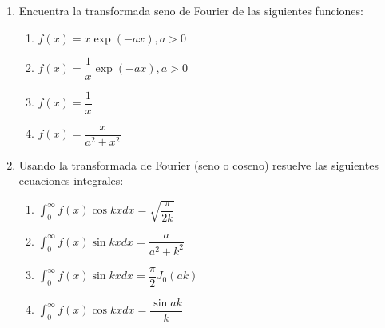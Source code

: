 \begin{enumerate}
\item Encuentra la transformada seno de Fourier de las siguientes funciones:
\begin{enumerate}[label=\roman*)]
\item $f(x) = x \exp(-a x), a>0$
\item $f(x) = \dfrac{1}{x} \exp(-a x), a>0$
\item $f(x) = \dfrac{1}{x}$
\item $f(x) = \dfrac{x}{a^{2} + x^{2}}$
\end{enumerate}
\item Usando la transformada de Fourier (seno o coseno) resuelve las siguientes ecuaciones integrales:
\begin{enumerate}[label=\roman*)]
\item $\displaystyle \int_{0}^{\infty} f(x) \cos kx dx = \sqrt{\dfrac{\pi}{2k}}$
\item $\displaystyle \int_{0}^{\infty} f(x) \sin kx dx = \dfrac{a}{a^{2} +k^{2}}$
\item $\displaystyle \int_{0}^{\infty} f(x) \sin kx dx = \dfrac{\pi}{2} J_{0} (ak)$
\item $\displaystyle \int_{0}^{\infty} f(x) \cos kx dx = \dfrac{\sin ak}{k}$
\end{enumerate}

\end{enumerate}
